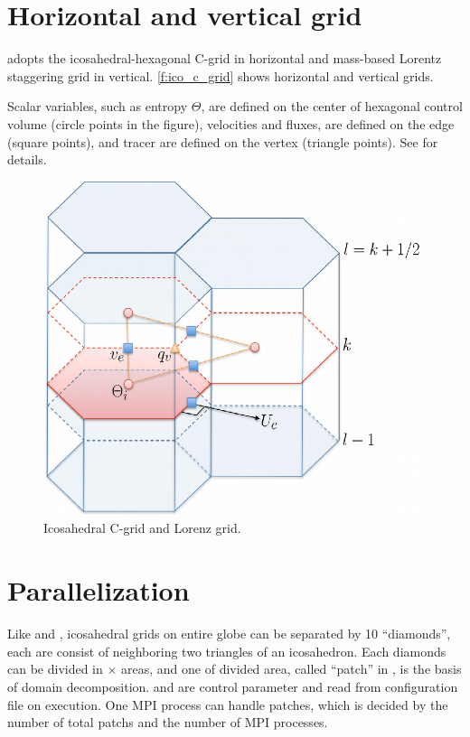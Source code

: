 \section{Horizontal and vertical grid}

\DYNAMICO adopts the icosahedral-hexagonal C-grid in horizontal and
mass-based Lorentz staggering grid in vertical.
%
\autoref{f:ico_c_grid} shows horizontal and vertical grids.

Scalar variables, such as entropy $\Theta$, are defined on the center of
hexagonal control volume (circle points in the figure), velocities and fluxes,
are defined on the edge (square points), and tracer are
defined on the vertex (triangle points).
%
See \cite{gmd-8-3131-2015} for details.


\begin{figure}
 \centering
 \includegraphics[scale=1]{figs/AIMES_DYNAMICO-08-0.png}
 \caption{Icosahedral C-grid and Lorenz grid.}\label{f:ico_c_grid}
\end{figure}



\section{Parallelization}

Like \NICAM and \DYNAMICO, icosahedral grids on entire globe can be
separated by 10 ``diamonds'', each are consist of neighboring two
triangles of an icosahedron.
%
Each diamonds can be divided in $\times$ areas,
and one of divided area,
called ``patch'' in \DYNAMICO, is the basis of domain decomposition.
%
 and  are control parameter and read from
configuration file on execution.
%
One MPI process can handle  patches, which is decided by
the number of total patchs and the number of MPI processes.



